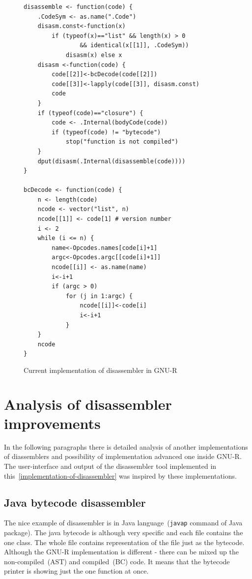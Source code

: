 \documentclass[thesis=M,english]{FITthesis}[2018/10/20]
\newcommand{\code}[1]{\texttt{#1}}
\begin{document}
\begin{figure}[!htb]
\begin{lstlisting}
disassemble <- function(code) {
    .CodeSym <- as.name(".Code")
    disasm.const<-function(x)
        if (typeof(x)=="list" && length(x) > 0
        		&& identical(x[[1]], .CodeSym))
            disasm(x) else x
    disasm <-function(code) {
        code[[2]]<-bcDecode(code[[2]])
        code[[3]]<-lapply(code[[3]], disasm.const)
        code
    }
    if (typeof(code)=="closure") {
        code <- .Internal(bodyCode(code))
        if (typeof(code) != "bytecode")
            stop("function is not compiled")
    }
    dput(disasm(.Internal(disassemble(code))))
}

bcDecode <- function(code) {
    n <- length(code)
    ncode <- vector("list", n)
    ncode[[1]] <- code[1] # version number
    i <- 2
    while (i <= n) {
        name<-Opcodes.names[code[i]+1]
        argc<-Opcodes.argc[[code[i]+1]]
        ncode[[i]] <- as.name(name)
        i<-i+1
        if (argc > 0)
            for (j in 1:argc) {
                ncode[[i]]<-code[i]
                i<-i+1
            }
    }
    ncode
}
\end{lstlisting}
	\caption{Current implementation of disassembler in GNU-R}\label{fig:current-implementation-of-disassembler}
\end{figure}


\section{Analysis of disassembler improvements}\label{analysis-of-disassembler}

In the following paragraphs there is detailed analysis of another implementations of diassemblers and possibility of implementation advanced one inside GNU-R. The user-interface and output of the disassembler tool implemented in this~\ref{implementation-of-disassembler} was inspired by these implementations. 

\subsection{Java bytecode disassembler}

The nice example of disassembler is in Java language~(\code{javap} command of Java package). The java bytecode is although very specific and each file contains the one class. The whole file contains representation of the file just as the bytecode. Although the GNU-R implementation is different - there can be mixed up the non-compiled~(AST) and compiled~(BC) code. It means that the bytecode printer is showing just the one function at once.
\end{document}
